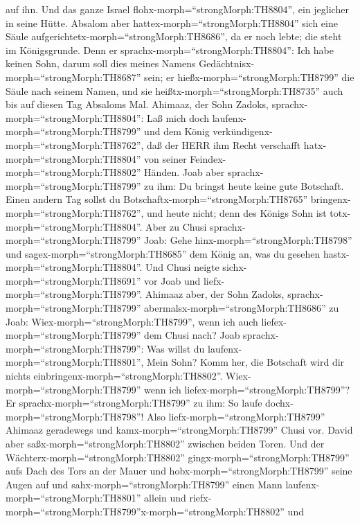 auf ihn. Und das ganze Israel flohx-morph=``strongMorph:TH8804'', ein
jeglicher in seine Hütte.  Absalom aber
hattex-morph=``strongMorph:TH8804'' sich eine Säule
aufgerichtetx-morph=``strongMorph:TH8686'', da er noch lebte; die steht
im Königsgrunde. Denn er sprachx-morph=``strongMorph:TH8804'': Ich habe
keinen Sohn, darum soll dies meines Namens
Gedächtnisx-morph=``strongMorph:TH8687'' sein; er
hießx-morph=``strongMorph:TH8799'' die Säule nach seinem Namen, und sie
heißtx-morph=``strongMorph:TH8735'' auch bis auf diesen Tag Absaloms
Mal.  Ahimaaz, der Sohn Zadoks,
sprachx-morph=``strongMorph:TH8804'': Laß mich doch
laufenx-morph=``strongMorph:TH8799'' und dem König
verkündigenx-morph=``strongMorph:TH8762'', daß der HERR ihm Recht
verschafft hatx-morph=``strongMorph:TH8804'' von seiner
Feindex-morph=``strongMorph:TH8802'' Händen.  Joab aber
sprachx-morph=``strongMorph:TH8799'' zu ihm: Du bringst heute keine gute
Botschaft. Einen andern Tag sollst du
Botschaftx-morph=``strongMorph:TH8765''
bringenx-morph=``strongMorph:TH8762'', und heute nicht; denn des Königs
Sohn ist totx-morph=``strongMorph:TH8804''.  Aber zu Chusi
sprachx-morph=``strongMorph:TH8799'' Joab: Gehe
hinx-morph=``strongMorph:TH8798'' und sagex-morph=``strongMorph:TH8685''
dem König an, was du gesehen hastx-morph=``strongMorph:TH8804''. Und
Chusi neigte sichx-morph=``strongMorph:TH8691'' vor Joab und
liefx-morph=``strongMorph:TH8799''.  Ahimaaz aber, der Sohn
Zadoks, sprachx-morph=``strongMorph:TH8799''
abermalsx-morph=``strongMorph:TH8686'' zu Joab:
Wiex-morph=``strongMorph:TH8799'', wenn ich auch
liefex-morph=``strongMorph:TH8799'' dem Chusi nach? Joab
sprachx-morph=``strongMorph:TH8799'': Was willst du
laufenx-morph=``strongMorph:TH8801'', Mein Sohn? Komm her, die Botschaft
wird dir nichts einbringenx-morph=``strongMorph:TH8802''. 
Wiex-morph=``strongMorph:TH8799'' wenn ich
liefex-morph=``strongMorph:TH8799''? Er
sprachx-morph=``strongMorph:TH8799'' zu ihm: So laufe
dochx-morph=``strongMorph:TH8798''! Also
liefx-morph=``strongMorph:TH8799'' Ahimaaz geradewegs und
kamx-morph=``strongMorph:TH8799'' Chusi vor.  David aber
saßx-morph=``strongMorph:TH8802'' zwischen beiden Toren. Und der
Wächterx-morph=``strongMorph:TH8802'' gingx-morph=``strongMorph:TH8799''
aufs Dach des Tors an der Mauer und hobx-morph=``strongMorph:TH8799''
seine Augen auf und sahx-morph=``strongMorph:TH8799'' einen Mann
laufenx-morph=``strongMorph:TH8801'' allein  und
riefx-morph=``strongMorph:TH8799''x-morph=``strongMorph:TH8802'' und
